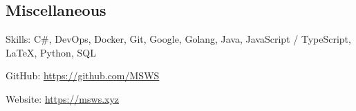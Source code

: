 \documentclass[10pt,letterpaper]{article}
\newenvironment{indentsection}[1]%
{\begin{list}{}%
	{\setlength{\leftmargin}{#1}}%
	\item[]%
}
{\end{list}}
\begin{document}

\subsection*{Miscellaneous}

\begin{indentsection}{\parindent}
    \begin{description*}
        \item[Skills:]
              C\#, DevOps, Docker, Git, Google, Golang, Java, JavaScript / TypeScript, \LaTeX, Python, SQL
        \item[GitHub:] \href{https://github.com/MSWS}{https://github.com/MSWS}
        \item[Website:] \href{https://msws.xyz}{https://msws.xyz}
    \end{description*}
\end{indentsection}
\end{document}
